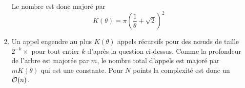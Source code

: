 \begin{Exercise}[title=Gravitation]
\begin{enumerate}
\begin{minipage}{0.5\textwidth}
 Le nombre est donc majoré par
\[K(\theta)= \pi \left(\frac 1\theta + \sqrt2\right)^2\]
\end{minipage}
\begin{minipage}{0.5\textwidth}
    \begin{center}
    \end{center}
\end{minipage}

    \item  Un appel  engendre au plus $K(\theta)$ appels récursifs pour des nœuds de taille $2^{-k}\times$  pour tout entier $k$ d'après la question ci-dessus. Comme  la profondeur de l'arbre est majorée par $m$, le nombre total d'appels est majoré par $mK(\theta)$ qui est une constante. Pour $N$ points la complexité est donc un ${\cal O}(n)$.
\end{enumerate}
\end{Exercise}



